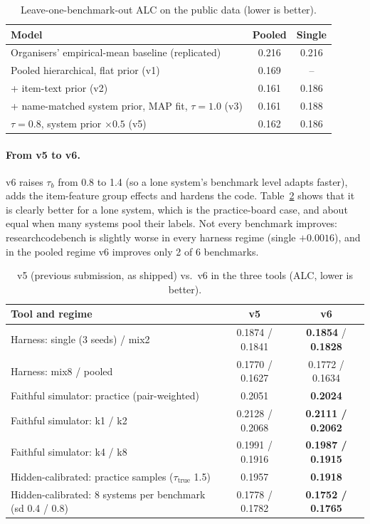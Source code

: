 \documentclass{article}
\begin{document}
\begin{table}[h]
  \caption{Leave-one-benchmark-out ALC on the public data (lower is better).}
  \label{tab:history}
  \centering\small
  \begin{tabular}{lcc}
    \toprule
    Model & Pooled & Single \\
    \midrule
    Organisers' empirical-mean baseline (replicated) & 0.216 & 0.216 \\
    Pooled hierarchical, flat prior (v1) & 0.169 & -- \\
    + item-text prior (v2) & 0.161 & 0.186 \\
    + name-matched system prior, MAP fit, $\tau = 1.0$ (v3) & 0.161 & 0.188 \\
    $\tau = 0.8$, system prior $\times 0.5$ (v5) & 0.162 & 0.186 \\
    \bottomrule
  \end{tabular}
\end{table}

\paragraph{From v5 to v6.} v6 raises $\tau_b$ from 0.8 to 1.4 (so a lone system's benchmark level adapts faster), adds the
item-feature group effects and hardens the code. Table~\ref{tab:v5v6} shows that it is clearly better for a lone system, which is the
practice-board case, and about equal when many systems pool their labels. Not every benchmark improves: researchcodebench is slightly
worse in every harness regime (single $+0.0016$), and in the pooled regime v6 improves only 2 of 6 benchmarks.

\begin{table}[h]
  \caption{v5 (previous submission, as shipped) vs.\ v6 in the three tools (ALC, lower is better).}
  \label{tab:v5v6}
  \centering\footnotesize
  \begin{tabular}{lcc}
    \toprule
    Tool and regime & v5 & v6 \\
    \midrule
    Harness: single (3 seeds) / mix2 & 0.1874 / 0.1841 & \textbf{0.1854} / \textbf{0.1828} \\
    Harness: mix8 / pooled & 0.1770 / 0.1627 & 0.1772 / 0.1634 \\
    Faithful simulator: practice (pair-weighted) & 0.2051 & \textbf{0.2024} \\
    Faithful simulator: k1 / k2 & 0.2128 / 0.2068 & \textbf{0.2111 / 0.2062} \\
    Faithful simulator: k4 / k8 & 0.1991 / 0.1916 & \textbf{0.1987 / 0.1915} \\
    Hidden-calibrated: practice samples ($\tau_{\text{true}}$ 1.5) & 0.1957 & \textbf{0.1918} \\
    Hidden-calibrated: 8 systems per benchmark (sd 0.4 / 0.8) & 0.1778 / 0.1782 & \textbf{0.1752 / 0.1765} \\
    \bottomrule
  \end{tabular}
\end{table}
\end{document}
